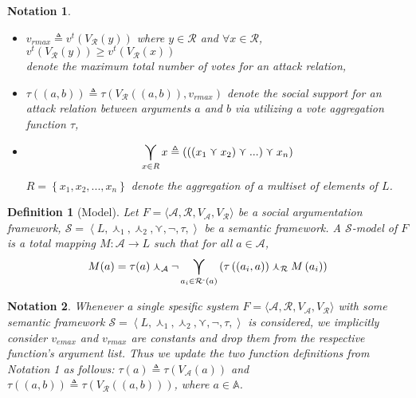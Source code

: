 \documentclass{article}
\newtheorem{definition}{Definition}
\newtheorem{notation}{Notation}
\newcommand{\args}{\mathcal{A}} %
\newcommand{\att}{\mathcal{R}}  %
\newcommand{\valueset}{L}
\newcommand{\varg}{V_{\args}}   %
\newcommand{\vargpro}[1]{\varg^+\left(#1\right)} %
\newcommand{\vargcon}[1]{\varg^-\left(#1\right)} %
\newcommand{\vargtot}[1]{\varg^{max}\left(#1\right)} %
\newcommand{\vatt}{V_{\att}}   %
\newcommand{\vattcon}[1]{\vatt^-\left(#1\right)} %
\newcommand{\attackers}[1]{\att^\text{-}\left(#1\right)}
\newcommand{\safid}{F}               %
\newcommand{\saf}{\safid = \safbody} %
\newcommand{\safbody}{\langle \args, \att, \varg, \vatt \rangle} %
\newcommand{\semid}{\mathcal{S}}        %
\newcommand{\sembodyNew}{\left\langle \valueset,\SAFand_1, \SAFand_2,\SAFor,\lnot,\tau, \right\rangle} %
\newcommand{\SAFand}{\curlywedge}     %
\newcommand{\SAFor}{\curlyvee}        %
\DeclareMathOperator*{\SAFOr}{\bigcurlyvee} %
\newcommand{\sem}{\mathcal{S}}
\begin{document}
\begin{notation}
\begin{itemize}
\begin{itemize}
\item  $ \vattcon{(a, b)} \triangleq y$ denote the number of negative votes for an attack relation between arguments  $a$ and $b$,
\end{itemize}
whenever $\vatt ((a, b)) = (x, y)$,
\item $v_{rmax} \triangleq v^t(\vatt(y))$ where $y \in \att$ and $\forall x \in \att$, $v^t(\vatt(y)) \ge v^t(\vatt(x))$ 
\\  denote the maximum total number of votes for an attack relation,
\item $\tau((a, b)) \triangleq \tau(V_{\mathcal{R}}((a, b)), v_{rmax})$ denote the social support for an attack relation between arguments  $a$ and $b$ via utilizing a vote aggregation function $\tau$,%
\item$$\SAFOr_{x \in R} x \triangleq\left(\left(\left(  x_{1}\SAFor x_{2}\right) \SAFor...\right)\SAFor x_{n}\right)$$ $R=\left\{  x_{1},x_{2},...,x_{n}\right\}$ denote the aggregation of a multiset of elements of $\valueset$. 
\end{itemize}
\end{notation}

\begin{definition}[Model]
\label{def:model}
  Let $\saf$ be a social argumentation framework, $\sem = \sembodyNew$ be a semantic framework. A $\semid$-model of $\safid$ is a total mapping $M : \args \rightarrow \valueset$ such that for all $a \in \args$,
  $$\displaystyle M(a) = \tau(a) \SAFand_\args \lnot \SAFOr_{a_i \in \attackers{a}} \left(\tau\left((a_i, a)\right) \SAFand_\att M\left(a_i\right)\right)$$
\end{definition}

\begin{notation}
Whenever a single spesific system $\saf$ with some semantic framework $\sem = \sembodyNew$ is considered, we implicitly consider $v_{emax}$ and $v_{rmax}$ are constants and drop them from the respective function's argument list. Thus we update the two function definitions from Notation 1 as follows: $\tau(a) \triangleq \tau(V_{\mathcal{A}}(a))$ and $\tau((a, b)) \triangleq \tau(V_{\mathcal{R}}((a, b)))$, where $a \in \mathbb{A}$.
\end{notation}
\end{document}
